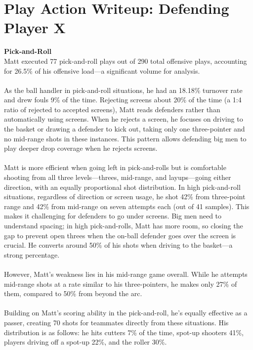 \documentclass[a4paper,12pt]{article}
\begin{document}
\section*{Play Action Writeup: Defending Player X}

\begin{multicols}{2}

    {\large \noindent \textbf{Pick-and-Roll}} \\
    Matt executed 77 pick-and-roll plays out of 290 total offensive plays, accounting for 26.5\% of his offensive load—a significant volume for analysis.\\ \\
    As the ball handler in pick-and-roll situations, he had an 18.18\% turnover rate and drew fouls 9\% of the time. Rejecting screens about 20\% of the time (a 1:4 ratio of rejected to accepted screens), Matt reads defenders rather than automatically using screens. When he rejects a screen, he focuses on driving to the basket or drawing a defender to kick out, taking only one three-pointer and no mid-range shots in these instances. This pattern allows defending big men to play deeper drop coverage when he rejects screens. \\ \\
    Matt is more efficient when going left in pick-and-rolls but is comfortable shooting from all three levels—threes, mid-range, and layups—going either direction, with an equally proportional shot distribution.
    In high pick-and-roll situations, regardless of direction or screen usage, he shot 42\% from three-point range and 42\% from mid-range on seven attempts each (out of 41 samples). This makes it challenging for defenders to go under screens. Big men need to understand spacing; in high pick-and-rolls, Matt has more room, so closing the gap to prevent open threes when the on-ball defender goes over the screen is crucial. He converts around 50\% of his shots when driving to the basket—a strong percentage. \\ \\
    However, Matt's weakness lies in his mid-range game overall. While he attempts mid-range shots at a rate similar to his three-pointers, he makes only 27\% of them, compared to 50\% from beyond the arc. \\ \\
    Building on Matt's scoring ability in the pick-and-roll, he's equally effective as a passer, creating 70 shots for teammates directly from these situations. His distribution is as follows: he hits cutters 7\% of the time, spot-up shooters 41\%, players driving off a spot-up 22\%, and the roller 30\%. \\ \\

\end{multicols}
\end{document}
